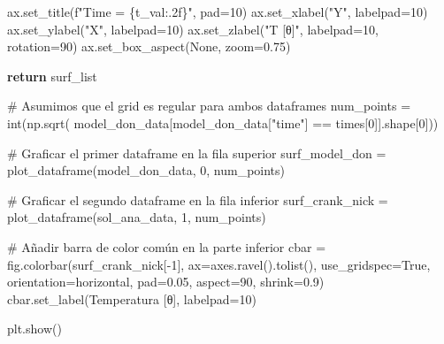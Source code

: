 \documentclass[
  spanish,
  us-letterpaper,
]{scrreprt}
\newenvironment{Shaded}{\begin{snugshade}}{\end{snugshade}}
\newcommand{\BuiltInTok}[1]{\textcolor[rgb]{0.00,0.23,0.31}{#1}}
\newcommand{\CommentTok}[1]{\textcolor[rgb]{0.37,0.37,0.37}{#1}}
\newcommand{\ControlFlowTok}[1]{\textcolor[rgb]{0.00,0.23,0.31}{\textbf{#1}}}
\newcommand{\DecValTok}[1]{\textcolor[rgb]{0.68,0.00,0.00}{#1}}
\newcommand{\FloatTok}[1]{\textcolor[rgb]{0.68,0.00,0.00}{#1}}
\newcommand{\NormalTok}[1]{\textcolor[rgb]{0.00,0.23,0.31}{#1}}
\newcommand{\OperatorTok}[1]{\textcolor[rgb]{0.37,0.37,0.37}{#1}}
\newcommand{\SpecialCharTok}[1]{\textcolor[rgb]{0.37,0.37,0.37}{#1}}
\newcommand{\SpecialStringTok}[1]{\textcolor[rgb]{0.13,0.47,0.30}{#1}}
\newcommand{\StringTok}[1]{\textcolor[rgb]{0.13,0.47,0.30}{#1}}
\newcommand{\VariableTok}[1]{\textcolor[rgb]{0.07,0.07,0.07}{#1}}
\theoremstyle{definition}
\theoremstyle{plain}
\theoremstyle{remark}
\begin{document}
\begin{Shaded}
\begin{Highlighting}[]
\NormalTok{        ax.set\_title(}\SpecialStringTok{f"Time = }\SpecialCharTok{\{}\NormalTok{t\_val}\SpecialCharTok{:.2f\}}\SpecialStringTok{"}\NormalTok{, pad}\OperatorTok{=}\DecValTok{10}\NormalTok{)}
\NormalTok{        ax.set\_xlabel(}\StringTok{"Y"}\NormalTok{, labelpad}\OperatorTok{=}\DecValTok{10}\NormalTok{)}
\NormalTok{        ax.set\_ylabel(}\StringTok{"X"}\NormalTok{, labelpad}\OperatorTok{=}\DecValTok{10}\NormalTok{)}
\NormalTok{        ax.set\_zlabel(}\StringTok{"T [θ]"}\NormalTok{, labelpad}\OperatorTok{=}\DecValTok{10}\NormalTok{, rotation}\OperatorTok{=}\DecValTok{90}\NormalTok{)}
\NormalTok{        ax.set\_box\_aspect(}\VariableTok{None}\NormalTok{, zoom}\OperatorTok{=}\FloatTok{0.75}\NormalTok{)}
    
    \ControlFlowTok{return}\NormalTok{ surf\_list}

\CommentTok{\# Asumimos que el grid es regular para ambos dataframes}
\NormalTok{num\_points }\OperatorTok{=} \BuiltInTok{int}\NormalTok{(np.sqrt(}
\NormalTok{        model\_don\_data[model\_don\_data[}\StringTok{"time"}\NormalTok{] }\OperatorTok{==}\NormalTok{ times[}\DecValTok{0}\NormalTok{]].shape[}\DecValTok{0}\NormalTok{]))}

\CommentTok{\# Graficar el primer dataframe en la fila superior}
\NormalTok{surf\_model\_don }\OperatorTok{=}\NormalTok{ plot\_dataframe(model\_don\_data, }\DecValTok{0}\NormalTok{, num\_points)}

\CommentTok{\# Graficar el segundo dataframe en la fila inferior}
\NormalTok{surf\_crank\_nick }\OperatorTok{=}\NormalTok{ plot\_dataframe(sol\_ana\_data, }\DecValTok{1}\NormalTok{, num\_points)}

\CommentTok{\# Añadir barra de color común en la parte inferior}
\NormalTok{cbar }\OperatorTok{=}\NormalTok{ fig.colorbar(surf\_crank\_nick[}\OperatorTok{{-}}\DecValTok{1}\NormalTok{], ax}\OperatorTok{=}\NormalTok{axes.ravel().tolist(),}
\NormalTok{                    use\_gridspec}\OperatorTok{=}\VariableTok{True}\NormalTok{, orientation}\OperatorTok{=}\StringTok{\textquotesingle{}horizontal\textquotesingle{}}\NormalTok{,}
\NormalTok{                    pad}\OperatorTok{=}\FloatTok{0.05}\NormalTok{, aspect}\OperatorTok{=}\DecValTok{90}\NormalTok{, shrink}\OperatorTok{=}\FloatTok{0.9}\NormalTok{)}
\NormalTok{cbar.set\_label(}\StringTok{\textquotesingle{}Temperatura [θ]\textquotesingle{}}\NormalTok{, labelpad}\OperatorTok{=}\DecValTok{10}\NormalTok{)}


\NormalTok{plt.show()}
\end{Highlighting}
\end{Shaded}
\end{document}
